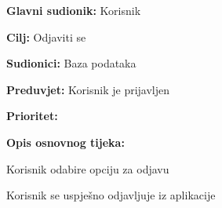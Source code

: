 \noindent {}
	\begin{packed_item}
	   	
	   	\item \textbf{Glavni sudionik: } Korisnik
	   	\item \textbf{Cilj:} Odjaviti se
	   	\item \textbf{Sudionici:} Baza podataka
	   	\item \textbf{Preduvjet:} Korisnik je prijavljen
	   	\item \textbf{Prioritet:} 
	   	\item \textbf{Opis osnovnog tijeka:} 
	   	
	   	\item[] \begin{packed_enum}
	   		
	   		\item Korisnik odabire opciju za odjavu
	   		\item Korisnik se uspješno odjavljuje iz aplikacije
	   		
	   	\end{packed_enum}
	\end{packed_item}	 

